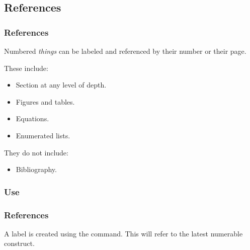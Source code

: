 {\begin{frame}[fragile]
\end{frame}

\subsection{References}
\begin{frame}[fragile]
  \frametitle{References}
  \vspace{3mm}
  Numbered \textsl{things} can be labeled and referenced by their number or their page.
  
  \vspace{5mm}
  These include:
  \begin{itemize}
    \item Section at any level of depth.
    \item Figures and tables.
    \item Equations.
    \item Enumerated lists.
  \end{itemize}
  
  \vspace{5mm}
  They do not include:
  \begin{itemize}
    \item Bibliography.
  \end{itemize}
\end{frame}

\subsubsection{Use}
\begin{frame}[fragile]
  \frametitle{References }
  \vspace{3mm}
  A label is created using the  command. This will refer to the latest numerable construct.
  

\end{frame}}
